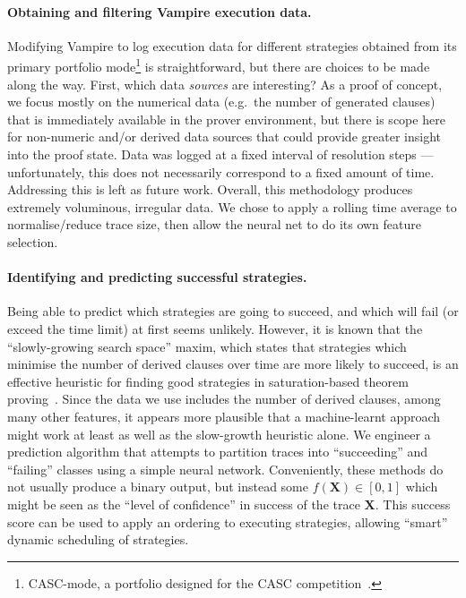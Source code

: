 \documentclass{easychair}
\begin{document}
\paragraph{Obtaining and filtering Vampire execution data.}
Modifying Vampire to log execution data for different strategies obtained from its primary portfolio mode\footnote{CASC-mode, a portfolio designed for the CASC competition~\cite{CASC}.} is straightforward, but there are choices to be made along the way.
First, which data \emph{sources} are interesting?
As a proof of concept, we focus mostly on the numerical data (e.g.\ the number of generated clauses) that is immediately available in the prover environment, but there is scope here for non-numeric and/or derived data sources that could provide greater insight into the proof state.
Data was logged at a fixed interval of resolution steps --- unfortunately, this does not necessarily correspond to a fixed amount of time. Addressing this is left as future work.
Overall, this methodology produces extremely voluminous, irregular data.
We chose to apply a rolling time average to normalise/reduce trace size, then allow the neural net to do its own feature selection.

\paragraph{Identifying and predicting successful strategies.}
Being able to predict which strategies are going to succeed, and which will fail (or exceed the time limit) at first seems unlikely.
However, it is known that the ``slowly-growing search space'' maxim, which states that strategies which minimise the number of derived clauses over time are more likely to succeed, is an effective heuristic for finding good strategies in saturation-based theorem proving~\cite{predict-success}.
Since the data we use includes the number of derived clauses, among many other features, it appears more plausible that a machine-learnt approach might work at least as well as the slow-growth heuristic alone.
We engineer a prediction algorithm that attempts to partition traces into ``succeeding'' and ``failing'' classes using a simple neural network. 
Conveniently, these methods do not usually produce a binary output, but instead some \(f(\mathbf{X}) \in \left[0, 1\right]\) which might be seen as the ``level of confidence'' in success of the trace \(\mathbf{X}\).
This success score can be used to apply an ordering to executing strategies, allowing ``smart'' dynamic scheduling of strategies.
\end{document}

